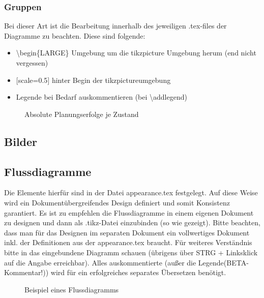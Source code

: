 \subsubsection{Gruppen}
Bei dieser Art ist die Bearbeitung innerhalb des jeweiligen .tex-files der Diagramme zu beachten. Diese sind folgende:
\begin{itemize}
	\item \textbackslash begin\{LARGE\} Umgebung um die tikzpicture Umgebung herum (end nicht vergessen)
	\item $[$scale=0.5$]$ hinter Begin der tikzpictureumgebung
	\item Legende bei Bedarf auskommentieren (bei \textbackslash addlegend)
\end{itemize}

\begin{figure}[htb]
	\centering
	\hfill
	\hfill
	\hfill
	\caption{Absolute Planungserfolge je Zustand}
	\label{abb:success_vs_state}
\end{figure}
\subsection{Bilder}

\subsection{Flussdiagramme}
Die Elemente hierfür sind in der Datei appearance.tex festgelegt. Auf diese Weise wird ein Dokumentübergreifendes Design definiert und somit Konsistenz garantiert. Es ist zu empfehlen die Flussdiagramme in einem eigenen Dokument zu designen und dann als .tikz-Datei einzubinden (so wie gezeigt). Bitte beachten, dass man für das Designen im separaten Dokument ein vollwertiges Dokument inkl. der Definitionen aus der appearance.tex braucht. Für weiteres Verständnis bitte in das eingebundene Diagramm schauen (übrigens über STRG + Linksklick auf die Angabe erreichbar). Alles auskommentierte (außer die Legende(BETA-Kommentar!)) wird für ein erfolgreiches separates Übersetzen benötigt.
\begin{figure}[H]
	\centering
	
	\caption{Beispiel eines Flussdiagramms}
	\label{abb:fluss}
\end{figure}


